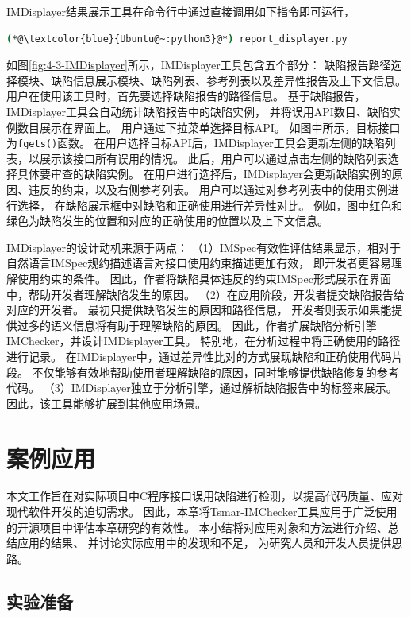IMDisplayer结果展示工具在命令行中通过直接调用如下指令即可运行，
\begin{lstlisting}[language={bash},
basicstyle=\linespread{0.8}\listingsfont,
numbers=none,
xleftmargin=.3\textwidth]
(*@\textcolor{blue}{Ubuntu@~:python3}@*) report_displayer.py
\end{lstlisting}
如图\ref{fig:4-3-IMDisplayer}所示，IMDisplayer工具包含五个部分：
缺陷报告路径选择模块、缺陷信息展示模块、缺陷列表、参考列表以及差异性报告及上下文信息。
用户在使用该工具时，首先要选择缺陷报告的路径信息。
基于缺陷报告，IMDisplayer工具会自动统计缺陷报告中的缺陷实例，
并将误用API数目、缺陷实例数目展示在界面上。
用户通过下拉菜单选择目标API。
如图中所示，目标接口为\texttt{fgets()}函数。
在用户选择目标API后，IMDisplayer工具会更新左侧的缺陷列表，以展示该接口所有误用的情况。
此后，用户可以通过点击左侧的缺陷列表选择具体要审查的缺陷实例。
在用户进行选择后，IMDisplayer会更新缺陷实例的原因、违反的约束，以及右侧参考列表。
用户可以通过对参考列表中的使用实例进行选择，
在缺陷展示框中对缺陷和正确使用进行差异性对比。
例如，图中红色和绿色为缺陷发生的位置和对应的正确使用的位置以及上下文信息。

IMDisplayer的设计动机来源于两点：
（1）IMSpec有效性评估结果显示，相对于自然语言IMSpec规约描述语言对接口使用约束描述更加有效，
即开发者更容易理解使用约束的条件。
因此，作者将缺陷具体违反的约束IMSpec形式展示在界面中，帮助开发者理解缺陷发生的原因。
（2）在应用阶段，开发者提交缺陷报告给对应的开发者。
最初只提供缺陷发生的原因和路径信息，
开发者则表示如果能提供过多的语义信息将有助于理解缺陷的原因。
因此，作者扩展缺陷分析引擎IMChecker，并设计IMDisplayer工具。
特别地，在分析过程中将正确使用的路径进行记录。
在IMDisplayer中，通过差异性比对的方式展现缺陷和正确使用代码片段。
不仅能够有效地帮助使用者理解缺陷的原因，同时能够提供缺陷修复的参考代码。
（3）IMDisplayer独立于分析引擎，通过解析缺陷报告中的标签来展示。
因此，该工具能够扩展到其他应用场景。

\section{案例应用}
\label{sec:4.4}
本文工作旨在对实际项目中C程序接口误用缺陷进行检测，以提高代码质量、应对现代软件开发的迫切需求。
因此，本章将Tsmar-IMChecker工具应用于广泛使用的开源项目中评估本章研究的有效性。
本小结将对应用对象和方法进行介绍、总结应用的结果、
并讨论实际应用中的发现和不足，
为研究人员和开发人员提供思路。

\subsection{实验准备}
